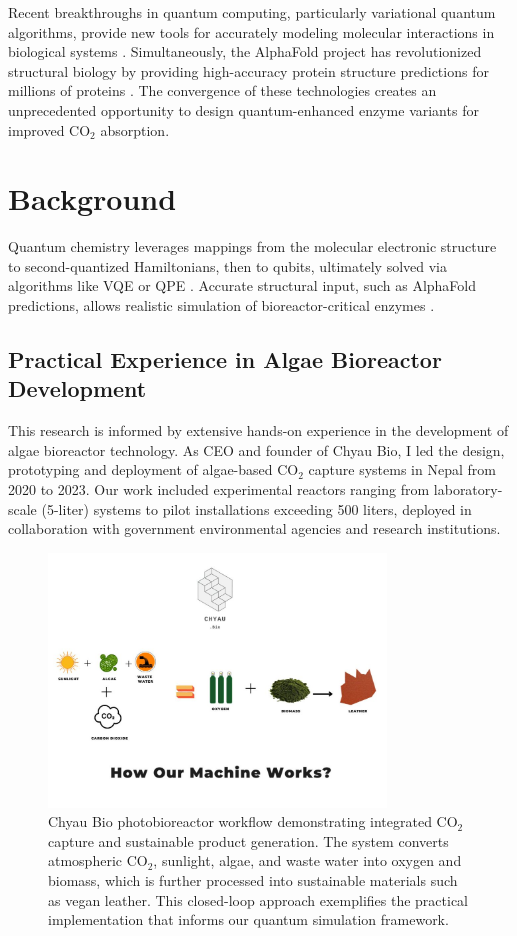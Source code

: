 \documentclass{article}
\begin{document}
Recent breakthroughs in quantum computing, particularly variational quantum algorithms, provide new tools for accurately modeling molecular interactions in biological systems \cite{cao2019,mcardle2020}. Simultaneously, the AlphaFold project has revolutionized structural biology by providing high-accuracy protein structure predictions for millions of proteins \cite{alphafold_nature,alphafold2}. The convergence of these technologies creates an unprecedented opportunity to design quantum-enhanced enzyme variants for improved CO$_2$ absorption.

\section{Background}
Quantum chemistry leverages mappings from the molecular electronic structure to second-quantized Hamiltonians, then to qubits, ultimately solved via algorithms like VQE or QPE \cite{cao2019,bravyi2002}. Accurate structural input, such as AlphaFold predictions, allows realistic simulation of bioreactor-critical enzymes \cite{alphafold3,alphafold4}.

\subsection{Practical Experience in Algae Bioreactor Development}

This research is informed by extensive hands-on experience in the development of algae bioreactor technology. As CEO and founder of Chyau Bio, I led the design, prototyping and deployment of algae-based CO$_2$ capture systems in Nepal from 2020 to 2023. Our work included experimental reactors ranging from laboratory-scale (5-liter) systems to pilot installations exceeding 500 liters, deployed in collaboration with government environmental agencies and research institutions.

\begin{figure}[h]
    \centering
    \includegraphics[width=0.8\textwidth]{How-Our-Machine-Works-1-1024x769.jpg}
    \caption{Chyau Bio photobioreactor workflow demonstrating integrated CO$_2$ capture and sustainable product generation. The system converts atmospheric CO$_2$, sunlight, algae, and waste water into oxygen and biomass, which is further processed into sustainable materials such as vegan leather. This closed-loop approach exemplifies the practical implementation that informs our quantum simulation framework.}
    \label{fig:chyau_reactor}
\end{figure}
\end{document}
